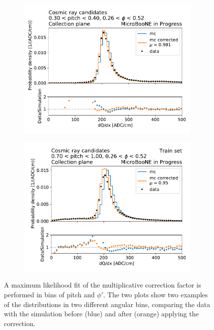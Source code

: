 \begin{figure}[H] 
\begin{center}
    \begin{subfigure}[b]{0.48\textwidth}
    \centering
    \includegraphics[width=1.00\textwidth]{recalibration/pitch_035_phi_039.pdf}
    \end{subfigure}
    \begin{subfigure}[b]{0.48\textwidth}
    \centering
    \includegraphics[width=1.00\textwidth]{recalibration/pitch_085_phi_039.pdf}
    \end{subfigure}
\caption{A maximum likelihood fit of the multiplicative correction factor is performed in bins of pitch and $\phi'$. 
The two plots show two examples of the \dqdx distributions in two different angular bins, comparing the data with the simulation before (blue) and after (orange) applying the correction.
}
\label{fig:recalibration_example}
\end{center}
\end{figure}

